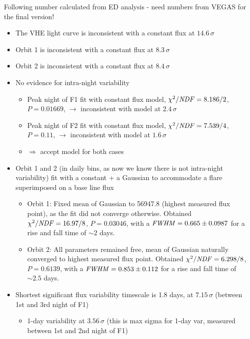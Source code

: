 \documentclass[preprint2]{aastex}
\begin{document}
Following number calculated from ED analysis - need numbers from VEGAS for the final version!
\begin{itemize}
  \item The VHE light curve is inconsistent with a constant flux at $14.6\,\sigma$
  \item Orbit 1 is inconsistent with a constant flux at $8.3\,\sigma$
  \item Orbit 2 is inconsistent with a constant flux at $8.4\,\sigma$
  \item No evidence for intra-night variability
    \begin{itemize}
      \item Peak night of F1 fit with constant flux model, $\chi^2/\mbox{\textit {NDF}} = 8.186/2$, $P = 0.01669$, $\rightarrow$ inconsistent with model at $2.4\,\sigma$
      \item Peak night of F2 fit with constant flux model, $\chi^2/\mbox{\textit {NDF}} = 7.539/4$, $P = 0.11$, $\rightarrow$ inconsistent with model at $1.6\,\sigma$
      \item $\Rightarrow$ accept model for both cases
    \end{itemize}
  \item Orbit 1 and 2 (in daily bins, as now we know there is not intra-night variability) fit with a constant + a Gaussian to accommodate a flare superimposed on a base line flux
  \begin{itemize}
    \item Orbit 1: Fixed mean of Gaussian to 56947.8 (highest measured flux point), as the fit did not converge otherwise. Obtained $\chi^2/\mbox{\textit {NDF}} = 16.97/8$, $P = 0.03046$, with a $\mbox{\textit{FWHM}} = 0.665 \pm 0.0987$ for a rise and fall time of $\sim2$ days.
    \item Orbit 2: All parameters remained free, mean of Gaussian naturally converged to highest measured flux point. Obtained $\chi^2/\mbox{\textit {NDF}} = 6.298/8$, $P = 0.6139$, with a $\mbox{\textit{FWHM}} = 0.853 \pm 0.112$ for a rise and fall time of $\sim2.5$ days.
  \end{itemize}
  \item Shortest significant flux variability timescale is 1.8 days, at $7.15\,\sigma$ (between 1st and 3rd night of F1)
  \begin{itemize}
    \item 1-day variability at $3.56\,\sigma$ (this is max sigma for 1-day var, measured between 1st and 2nd night of F1)

\end{itemize}
\end{itemize}
\end{document}
